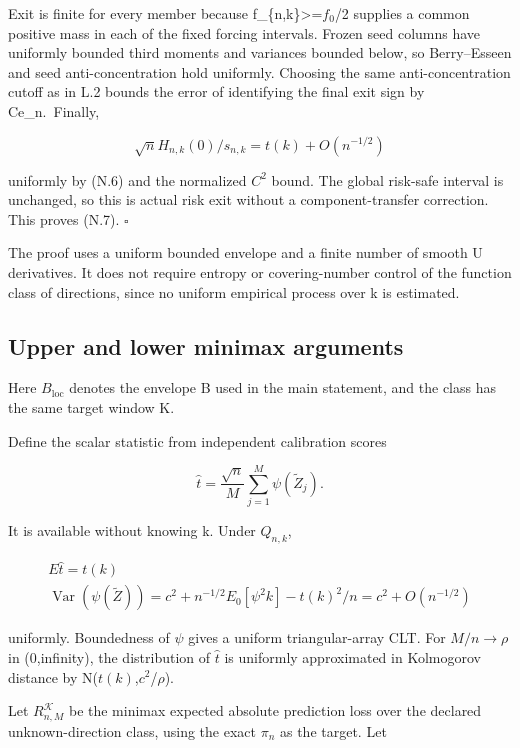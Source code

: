 Exit is finite for every member because f\_\{n,k\}\textgreater=\(f_0\)/2 supplies a common positive mass in each of the fixed forcing intervals. Frozen seed columns have uniformly bounded third moments and variances bounded below, so Berry--Esseen and seed anti-concentration hold uniformly. Choosing the same anti-concentration cutoff as in L.2 bounds the error of identifying the final exit sign by Ce\_n.~Finally,

\[
\sqrt n H_{n,k}(0)/s_{n,k}=t(k)+O(n^{-1/2})
\]

uniformly by (N.6) and the normalized \(C^2\) bound. The global risk-safe interval is unchanged, so this is actual risk exit without a component-transfer correction. This proves (N.7). \(\square\)

The proof uses a uniform bounded envelope and a finite number of smooth U derivatives. It does not require entropy or covering-number control of the function class of directions, since no uniform empirical process over k is estimated.

\subsection{Upper and lower minimax arguments}\label{upper-and-lower-minimax-arguments}

Here \(B_{\mathrm{loc}}\) denotes the envelope B used in the main statement, and the class has the same target window K.

Define the scalar statistic from independent calibration scores

\[
\widehat t=\frac{\sqrt n}{M}\sum_{j=1}^M\psi(\widetilde Z_j).
\tag{N.8}
\]

It is available without knowing k. Under \(Q_{n,k}\),

\[
\begin{gathered}
E\widehat t=t(k) \\
\operatorname{Var}(\psi(\widetilde Z))
=c^2+n^{-1/2}E_0[\psi^2 k]-t(k)^2/n
=c^2+O(n^{-1/2})
\tag{N.9}
\end{gathered}
\]

uniformly. Boundedness of \(\psi\) gives a uniform triangular-array CLT. For \(M/n\to\rho\) in (0,infinity), the distribution of \(\widehat t\) is uniformly approximated in Kolmogorov distance by N(\(t(k)\),\(c^2\)/\(\rho\)).

Let \(R^{\mathcal K}_{n,M}\) be the minimax expected absolute prediction loss over the declared unknown-direction class, using the exact \(\pi_n\) as the target. Let

